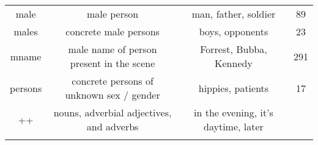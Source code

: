 \documentclass[10pt,a4paper,onecolumn]{article}
\begin{document}
\begin{center}
\begin{tabular}{ |c|c|c|c| }
male & male person & man, father, soldier & 89\\
males & concrete male persons & boys, opponents & 23\\
mname & male name of person present in the scene & Forrest, Bubba, Kennedy & 291\\
persons & concrete persons of unknown sex / gender & hippies, patients & 17\\
++ & nouns, adverbial adjectives, and adverbs & in the evening, it's daytime, later \\
\hline
\label{tab:descr-nouns-old}
\end{tabular}
\end{center}
\end{document}

